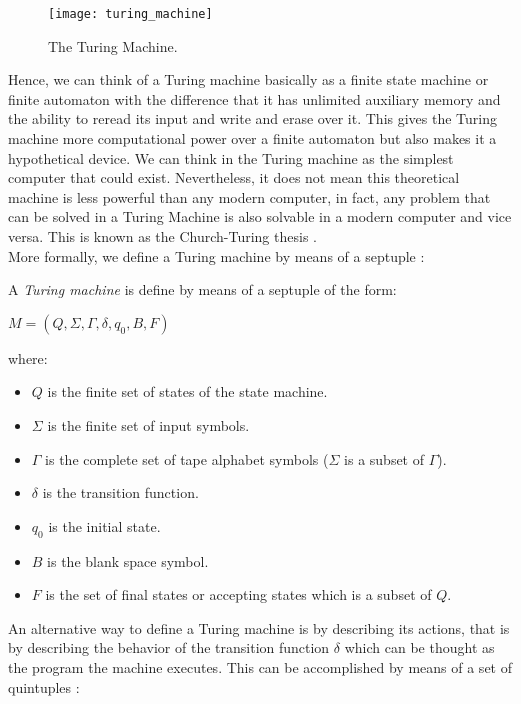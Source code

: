 \begin{figure}
	\centering
		\texttt{[image: turing\_machine]}
	\caption{The Turing Machine.}
	\label{fig:turing_machine}
\end{figure}

Hence, we can think of a Turing machine basically as a finite state machine or finite automaton with the difference that it has unlimited auxiliary memory and the ability to reread its input and write and erase over it. This gives the Turing machine more computational power over a finite automaton but also makes it a hypothetical device\cite{judith}.
We can think in the Turing machine as the simplest computer that could exist. Nevertheless, it does not mean this theoretical machine is less powerful than any modern computer, in fact, any problem that can be solved in a Turing Machine is also solvable in a modern computer and vice versa. This is known as the Church-Turing thesis \cite{behrouz}.\\

More formally, we define a Turing machine by means of a septuple \cite{hopcroft}:

\begin{defn}
	A \textit{Turing machine} is define by means of a septuple of the form: \\
	\begin{center}
	$M=(Q, \Sigma, \Gamma, \delta,q_{0},B,F)$
	\end{center}
	where:
	\begin{itemize}
	\item $Q$ is the finite set of states of the state machine.
	\item $\Sigma$ is the finite set of input symbols.
	\item $\Gamma$ is the complete set of tape alphabet symbols ($\Sigma$ is a subset of $\Gamma$).
	\item $\delta$ is the transition function.
	\item $q_{0}$ is the initial state.
	\item $B$ is the blank space symbol.
	\item $F$ is the set of final states or accepting states which is a subset of $Q$. 
	\end{itemize}
\end{defn}

An alternative way to define a Turing machine is by describing its actions, that is by describing the behavior of the transition function $\delta$ which can be thought as the program the machine executes. This can be accomplished by means of a set of quintuples \cite{judith}:

